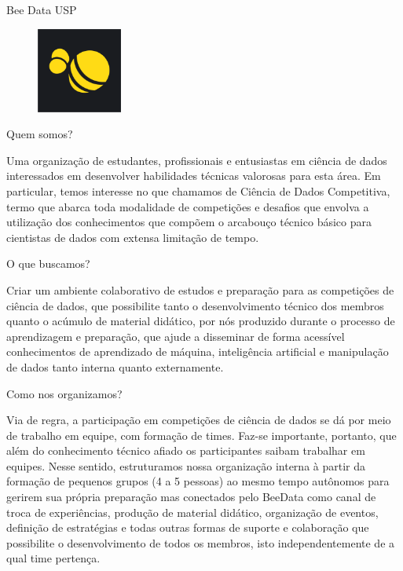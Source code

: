 \begin{subsecao}{Bee Data USP}

\begin{figure}
	\vspace{-25pt}
	\begin{center}
		\includegraphics[width=0.25\textwidth]{img/beedata.png}
	\end{center}
	\vspace{-25pt}
\end{figure}

Quem somos?

Uma organização de estudantes, profissionais e entusiastas em ciência
de dados interessados em desenvolver habilidades técnicas valorosas para
esta área. Em particular, temos interesse no que chamamos de Ciência de
Dados Competitiva, termo que abarca toda modalidade de competições e desafios
que envolva a utilização dos conhecimentos que compõem o arcabouço técnico
básico para cientistas de dados com extensa limitação de tempo.

O que buscamos?

Criar um ambiente colaborativo de estudos e preparação para as competições de
ciência de dados, que possibilite tanto o desenvolvimento técnico dos membros
quanto o acúmulo de material didático, por nós produzido durante o processo de
aprendizagem e preparação, que ajude a disseminar de forma acessível conhecimentos
de aprendizado de máquina, inteligência artificial e manipulação de dados tanto
interna quanto externamente.

Como nos organizamos?

Via de regra, a participação em competições de ciência de dados se dá por meio
de trabalho em equipe, com formação de times. Faz-se importante, portanto, que
além do conhecimento técnico afiado os participantes saibam trabalhar em equipes.
Nesse sentido, estruturamos nossa organização interna à partir da formação de
pequenos grupos (4 a 5 pessoas) ao mesmo tempo autônomos para gerirem sua própria
preparação mas conectados pelo BeeData como canal de troca de experiências, produção
de material didático, organização de eventos, definição de estratégias e todas outras
formas de suporte e colaboração que possibilite o desenvolvimento de todos os membros,
isto independentemente de a qual time pertença.


\end{subsecao}
